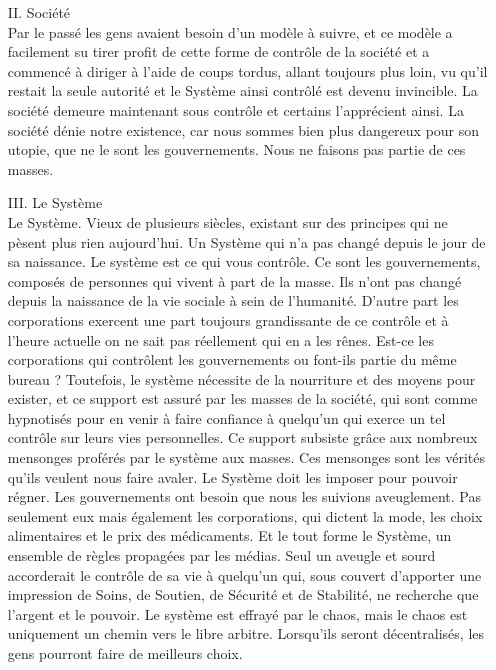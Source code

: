 \documentclass[11pt,twoside,a4paper]{book}
\begin{document}
\begin{enumerate}
	\item[II.] Soci{\'e}t{\'e} ~\\
		Par le pass{\'e} les gens avaient besoin d'un mod{\`e}le {\`a} suivre, et ce mod{\`e}le a facilement su tirer profit de cette forme de contr{\^o}le de la soci{\'e}t{\'e} et a commenc{\'e} {\`a} diriger {\`a} l'aide de coups tordus, allant toujours plus loin, vu qu'il restait la seule autorit{\'e} et le Syst{\`e}me ainsi contr{\^o}l{\'e} est devenu invincible. La soci{\'e}t{\'e} demeure maintenant sous contr{\^o}le et certains l'appr{\'e}cient ainsi.
		La soci{\'e}t{\'e} d{\'e}nie notre existence, car nous sommes bien plus dangereux pour son utopie, que ne le sont les gouvernements. Nous ne faisons pas partie de ces masses.
	\item[III.] Le Syst{\`e}me ~\\
		Le Syst{\`e}me. Vieux de plusieurs si{\`e}cles, existant sur des principes qui ne p{\`e}sent plus rien aujourd'hui. Un Syst{\`e}me qui n'a pas chang{\'e} depuis le jour de sa naissance. Le syst{\`e}me est ce qui vous contr{\^o}le. Ce sont les gouvernements, compos{\'e}s de personnes qui vivent {\`a} part de la masse. Ils n'ont pas chang{\'e} depuis la naissance de la vie sociale {\`a} sein de l'humanit{\'e}. D'autre part les corporations exercent une part toujours grandissante de ce contr{\^o}le et {\`a} l'heure actuelle on ne sait pas r{\'e}ellement qui en a les r{\^e}nes. Est-ce les corporations qui contr{\^o}lent les gouvernements ou font-ils partie du m{\^e}me bureau ? Toutefois, le syst{\`e}me n{\'e}cessite de la nourriture et des moyens pour exister, et ce support est assur{\'e} par les masses de la soci{\'e}t{\'e}, qui sont comme hypnotis{\'e}s pour en venir {\`a} faire confiance {\`a} quelqu'un qui exerce un tel contr{\^o}le sur leurs vies personnelles. Ce support subsiste gr{\^a}ce aux nombreux mensonges prof{\'e}r{\'e}s par le syst{\`e}me aux masses. Ces mensonges sont les v{\'e}rit{\'e}s qu'ils veulent nous faire avaler. Le Syst{\`e}me doit les imposer pour pouvoir r{\'e}gner. Les gouvernements ont besoin que nous les suivions aveuglement. Pas seulement eux mais {\'e}galement les corporations, qui dictent la mode, les choix alimentaires et le prix des m{\'e}dicaments. Et le tout forme le Syst{\`e}me, un ensemble de r{\`e}gles propag{\'e}es par les m{\'e}dias. Seul un aveugle et sourd accorderait le contr{\^o}le de sa vie {\`a} quelqu'un qui, sous couvert d'apporter une impression de Soins, de Soutien, de S{\'e}curit{\'e} et de Stabilit{\'e}, ne recherche que l'argent et le pouvoir. Le syst{\`e}me est effray{\'e} par le chaos, mais le chaos est uniquement un chemin vers le libre arbitre. Lorsqu'ils seront d{\'e}centralis{\'e}s, les gens pourront faire de meilleurs choix. 

\end{enumerate}
\end{document}
